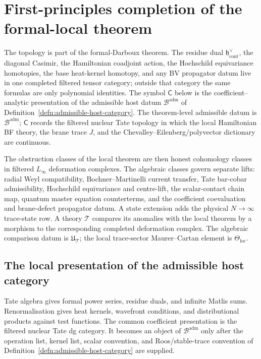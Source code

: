 \section{First-principles completion of the formal-local theorem}
\label{app:completion-formal-local-theorem}

The topology is part of the formal-Darboux theorem.  The residue dual
\(\mathfrak h^\vee_{\mathrm{cont}}\), the diagonal Casimir, the
Hamiltonian coadjoint action, the Hochschild equivariance homotopies, the
base heat-kernel homotopy, and any BV propagator datum live in one
completed filtered tensor category; outside that category the same
formulas are only polynomial identities.  The symbol \(\mathsf C\) below is
the coefficient--analytic presentation of the admissible host datum
\(\mathcal B^{\mathrm{adm}}\) of
Definition~\ref{defn:admissible-host-category}.  The theorem-level
admissible datum is \(\mathcal B^{\mathrm{adm}}\); \(\mathsf C\) records the
filtered nuclear Tate topology in which the local Hamiltonian BF theory,
the brane trace \(J\), and the Chevalley--Eilenberg/polyvector
dictionary are continuous.

The obstruction classes of the local theorem are then honest
cohomology classes in filtered \(L_\infty\) deformation complexes.
The algebraic classes govern separate lifts: radial Weyl compatibility,
Bochner--Martinelli current transfer, Tate bar-cobar admissibility,
Hochschild equivariance and centre-lift, the scalar-contact chain map,
quantum master equation counterterms, and the coefficient coevaluation
and brane-defect propagator datum.  A state extension adds the physical
\(N\to\infty\) trace-state row.  A theory \(\mathcal T\) compares its
anomalies with the local theorem by a morphism to the corresponding
completed deformation complex.  The algebraic comparison datum is
\(\mathfrak U_{\mathcal T}\); the local trace-sector Maurer--Cartan
element is \(\Theta_{\mathrm{loc}}\).

\subsection{The local presentation of the admissible host category}
\label{ssec:completion-host-category}

Tate algebra gives formal power series, residue duals, and infinite
Matlis sums.  Renormalisation gives heat kernels, wavefront
conditions, and distributional products against test functions.  The
common coefficient presentation is the filtered nuclear Tate dg
category.  It becomes an object of
\(\mathcal B^{\mathrm{adm}}\) only after the operation list, kernel list,
scalar convention, and Roos/stable-trace convention of
Definition~\ref{defn:admissible-host-category} are supplied.

